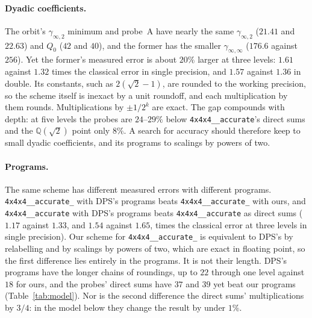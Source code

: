 \documentclass[11pt]{article}
\theoremstyle{remark}
\newcommand{\Q}{\mathbb{Q}}
\newcommand{\ginf}{\gamma_{\infty,2}}
\newcommand{\giinf}{\gamma_{\infty,\infty}}
\newcommand{\acc}{\texttt{4x4x4\_\allowbreak 48\_\allowbreak accurate}\xspace}
\newcommand{\acct}{\texttt{4x4x4\_\allowbreak 48\_\allowbreak accurate\_\allowbreak 262}\xspace}
\begin{document}
\paragraph{Dyadic coefficients.}
The orbit's $\ginf$ minimum and probe~A have nearly the same $\ginf$
($21.41$ and $22.63$) and $Q_0$ ($42$ and $40$), and the former has
the smaller $\giinf$ ($176.6$ against $256$).  Yet the former's measured
error is about $20\%$ larger at three levels: $1.61$ against $1.32$ times the
classical error in single precision, and $1.57$ against $1.36$ in double.  Its constants, such as $2(\sqrt2-1)$,
are rounded to the working precision, so the scheme itself is inexact by
a unit roundoff, and each multiplication by them rounds.  Multiplications
by $\pm1/2^k$ are exact.  The gap compounds with depth: at five levels
the probes are $24$--$29\%$ below \acc's direct sums and the
$\Q(\sqrt2)$ point only $8\%$.  A search for accuracy should therefore
keep to small dyadic coefficients, and its programs to scalings by
powers of two.

\paragraph{Programs.}
The same scheme has different measured errors with different
programs.  \acct with DPS's programs beats \acct with ours, and \acc
with DPS's programs beats \acc as direct sums
($1.17$ against $1.33$, and $1.54$ against $1.65$, times the classical
error at three levels in single precision).  Our scheme for \acct is
equivalent to DPS's by relabelling and by scalings by powers of two,
which are exact in floating point, so the first difference lies entirely
in the programs.  It is not their length.  DPS's programs have the
longer chains of roundings, up to $22$ through one level against $18$
for ours, and the probes' direct sums have $37$ and $39$ yet beat our
programs (Table~\ref{tab:model}).  Nor is the second difference the
direct sums' multiplications by $3/4$: in the model below they change
the result by under $1\%$.
\end{document}

